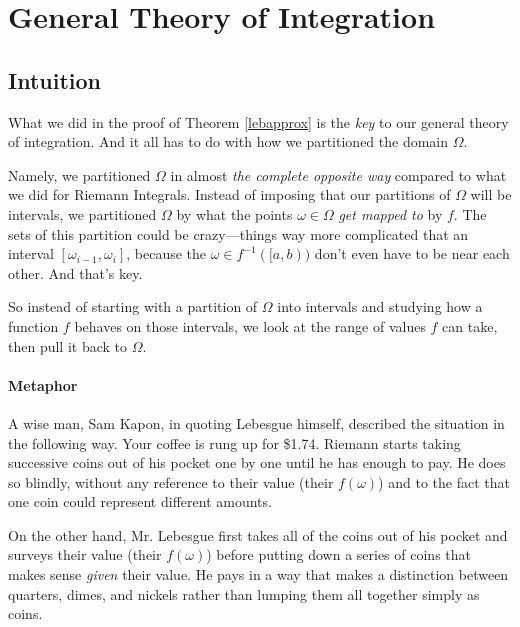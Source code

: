 \documentclass[12pt]{article}
\theoremstyle{plain}
\theoremstyle{definition}
\theoremstyle{remark}
\begin{document}
\clearpage
\section{General Theory of Integration}

\subsection{Intuition}

What we did in the proof of Theorem \ref{lebapprox} is the \emph{key} to
our general theory of integration.  And it all has to do with how we
partitioned the domain $\Omega$.

Namely, we partitioned $\Omega$ in almost
\emph{the complete opposite way} compared to what we did for Riemann
Integrals. Instead of imposing that our partitions of $\Omega$ will be
intervals, we partitioned $\Omega$ by what the points $\omega\in \Omega$
\emph{get mapped to} by $f$. The sets of this partition could be
crazy---things way more complicated that an interval
$[\omega_{i-1}, \omega_i]$, because the $\omega\in f^{-1}([a,b))$ don't even
have to be near each other.  And that's key.

So instead of starting with a partition of $\Omega$ into intervals and
studying how a function $f$ behaves on those intervals, we look at the
range of values $f$ can take, then pull it back to $\Omega$.

\paragraph{Metaphor}
A wise man, Sam Kapon, in quoting Lebesgue himself, described the
situation in the following way. Your coffee is rung up for \$1.74.
Riemann starts taking successive coins out of his pocket one by one
until he has enough to pay. He does so blindly, without any reference to
their value (their $f(\omega)$) and to the fact that one coin could represent
different amounts.

On the other hand, Mr. Lebesgue first takes all of the coins out of his
pocket and surveys their value (their $f(\omega)$) before putting down a
series of coins that makes sense \emph{given} their value. He pays in a
way that makes a distinction between quarters, dimes, and nickels rather
than lumping them all together simply as coins.
\end{document}
